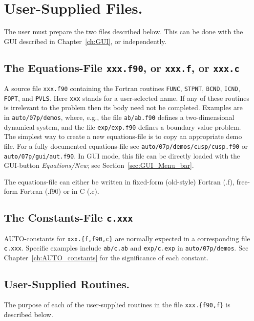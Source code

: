 \documentclass[12pt]{report}
\begin{document}
\chapter{ User-Supplied Files.} \label{ch:User_supplied_files}
The user must prepare the two files described below.
This can be done with the GUI described in Chapter~\ref{ch:GUI}, 
or independently.

\section{ The Equations-File \texttt{xxx.f90}, or \texttt{xxx.f}, or \texttt{xxx.c}} 
A source file {\tt xxx.f90} containing the Fortran routines
{\tt FUNC}, {\tt STPNT}, {\tt BCND}, {\tt ICND}, {\tt FOPT}, and {\tt PVLS}.
Here {\tt xxx} stands for a user-selected name. 
If any of these routines is irrelevant 
to the problem then its body need not be completed.
Examples are in {\tt auto/07p/demos}, where, e.g.,
the file {\tt ab/ab.f90} defines a two-dimensional dynamical system,
and the file {\tt exp/exp.f90} defines a boundary value problem.
The simplest way to create a new equations-file is to copy 
an appropriate demo file.
For a fully documented equations-file see
{\tt auto/07p/demos/cusp/cusp.f90} or {\tt auto/07p/gui/aut.f90}.
In GUI mode, this file can be directly loaded with the GUI-button 
{\it Equations/New}; see Section~\ref{sec:GUI_Menu_bar}.
 
The equations-file can either be written in fixed-form (old-style)
Fortran (.f), free-form Fortran (.f90) or in C (.c).

\section{ The Constants-File \texttt{c.xxx}} 
{\cal AUTO}-constants for {\tt xxx.\{f,f90,c\}} are normally expected 
in a corresponding file {\tt c.xxx}.
Specific examples include {\tt ab/c.ab}
and {\tt exp/c.exp} in {\tt auto/07p/demos}.
See Chapter~\ref{ch:AUTO_constants}
for the significance of each constant.

\newpage
\section{ User-Supplied Routines.} \label{sec: User_supplied_routines}
The purpose of each of the user-supplied routines in
the file {\tt xxx.\{f90,f\}} is described below.
  
\end{document}
